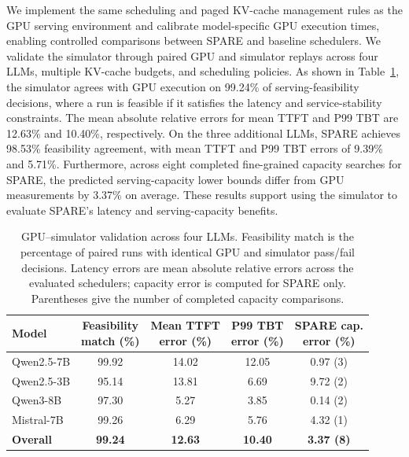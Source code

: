 \documentclass[sigconf,anonymous,review]{acmart}
\begin{document}
We implement the same scheduling and paged KV-cache management rules
as the GPU serving environment and calibrate model-specific GPU
execution times, enabling controlled comparisons between SPARE and
baseline schedulers. We validate the simulator through paired GPU
and simulator replays across four LLMs, multiple KV-cache budgets,
and scheduling policies. As shown in
Table~\ref{tab:simulator-validation}, the simulator agrees with GPU
execution on 99.24\% of serving-feasibility decisions, where a run is
feasible if it satisfies the latency and service-stability constraints.
The mean absolute relative errors for mean TTFT and P99 TBT are
12.63\% and 10.40\%, respectively. On the three additional LLMs,
SPARE achieves 98.53\% feasibility agreement, with mean TTFT and
P99 TBT errors of 9.39\% and 5.71\%. Furthermore, across eight
completed fine-grained capacity searches for SPARE, the predicted
serving-capacity lower bounds differ from GPU measurements by
3.37\% on average. These results support using the simulator to
evaluate SPARE's latency and serving-capacity benefits.


\begin{table}[t]
  \centering
  \caption{GPU--simulator validation across four LLMs. Feasibility
  match is the percentage of paired runs with identical GPU and
  simulator pass/fail decisions. Latency errors are mean absolute
  relative errors across the evaluated schedulers; capacity error is
  computed for SPARE only. Parentheses give the number of completed
  capacity comparisons.}
  \label{tab:simulator-validation}

  \footnotesize
  \setlength{\tabcolsep}{3pt}
  \renewcommand{\arraystretch}{1.15}

  \begin{tabular*}{\columnwidth}
    {@{\extracolsep{\fill}}lcccc@{}}
    \toprule
    Model &
    \shortstack{Feasibility\\match (\%)} &
    \shortstack{Mean TTFT\\error (\%)} &
    \shortstack{P99 TBT\\error (\%)} &
    \shortstack{SPARE cap.\\error (\%)} \\
    \midrule
    Qwen2.5-7B & 99.92 & 14.02 & 12.05 & 0.97 (3) \\
    Qwen2.5-3B & 95.14 & 13.81 & 6.69  & 9.72 (2) \\
    Qwen3-8B   & 97.30 & 5.27  & 3.85  & 0.14 (2) \\
    Mistral-7B & 99.26 & 6.29  & 5.76  & 4.32 (1) \\
    \midrule
    \textbf{Overall}
    & \textbf{99.24}
    & \textbf{12.63}
    & \textbf{10.40}
    & \textbf{3.37 (8)} \\
    \bottomrule
  \end{tabular*}
\end{table}
\end{document}
